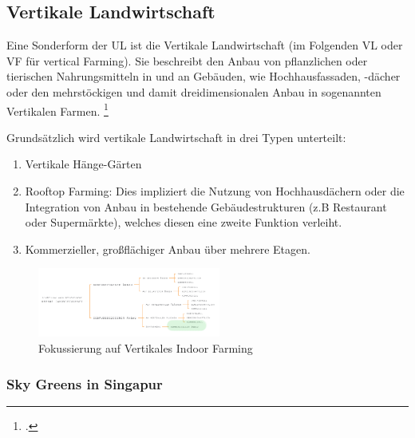 \documentclass{scrartcl}
\begin{document}
\subsection{Vertikale Landwirtschaft}

Eine Sonderform der UL ist die Vertikale Landwirtschaft (im Folgenden VL oder VF für vertical Farming). Sie beschreibt den Anbau von pflanzlichen oder tierischen Nahrungsmitteln in und an Gebäuden, wie Hochhausfassaden, -dächer oder den mehrstöckigen und damit dreidimensionalen Anbau in sogenannten Vertikalen Farmen. \footcite{StadtischeFarming} 



Grundsätzlich wird vertikale Landwirtschaft in drei Typen unterteilt:\\ 

\begin{enumerate}
    \item Vertikale Hänge-Gärten 
    \item Rooftop Farming: Dies impliziert die Nutzung von Hochhausdächern oder die Integration von Anbau in bestehende Gebäudestrukturen (z.B Restaurant oder Supermärkte), welches diesen eine zweite Funktion verleiht.
    \item Kommerzieller, großflächiger Anbau über mehrere Etagen.
\end{enumerate}

\begin{figure}[htbp]
\centering
\includegraphics[width=6cm]{image_folder/moglicheEinteilungena_s32.png}
\caption{Fokussierung auf Vertikales Indoor Farming}
\label{fig:Fokussierung auf Vertikales Indoor Farming}
\end{figure}

\subsubsection{Sky Greens in Singapur}
\end{document}

